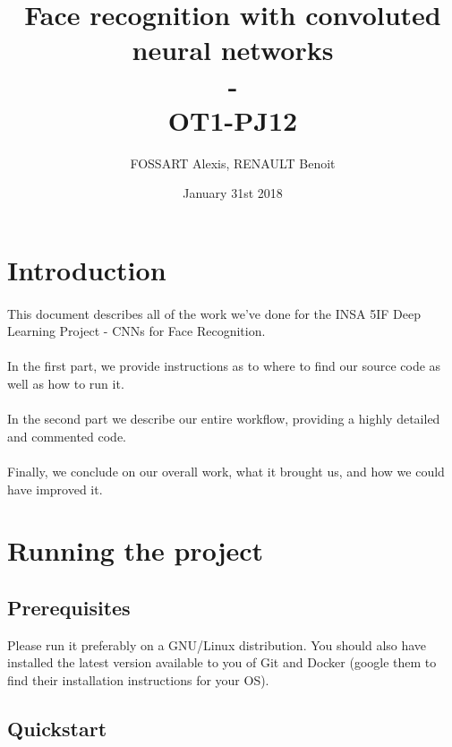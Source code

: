 \documentclass[french]{article}
\title{Face recognition with convoluted neural networks
\\-
\\OT1-PJ12}
\author{FOSSART Alexis, RENAULT Benoit}
\date{January 31st 2018}
\begin{document}
\maketitle

\medskip

\tableofcontents

\newpage

\section{Introduction}

\paragraph{} This document describes all of the work we've done for the INSA 5IF Deep Learning Project - CNNs for Face Recognition.

\paragraph{} In the first part, we provide instructions as to where to find our source code as well as how to run it.

\paragraph{} In the second part we describe our entire workflow, providing a highly detailed and commented code.

\paragraph{} Finally, we conclude on our overall work, what it brought us, and how we could have improved it.

\section{Running the project}

\subsection{Prerequisites}

Please run it preferably on a GNU/Linux distribution. You should also have installed the latest version available to you of Git and Docker (google them to find their installation instructions for your OS).

\subsection{Quickstart}
\end{document}
